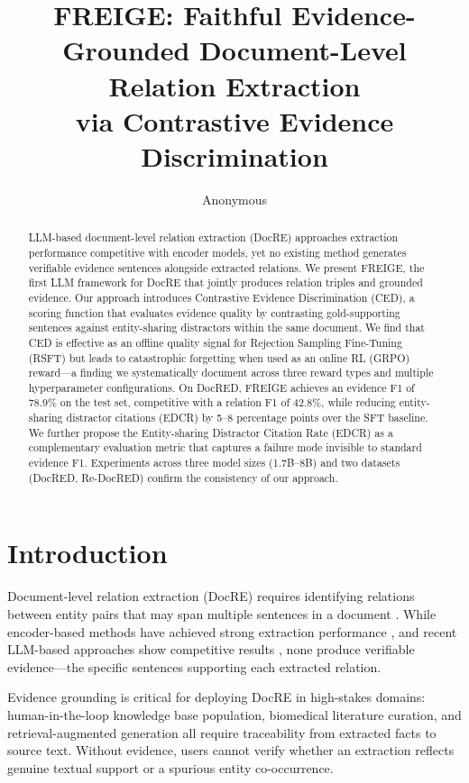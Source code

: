 \documentclass[11pt,a4paper]{article}
\title{FREIGE: Faithful Evidence-Grounded Document-Level Relation Extraction\\via Contrastive Evidence Discrimination}
\author{Anonymous}
\newcommand{\method}{FREIGE}
\newcommand{\ced}{CED}
\newcommand{\edcr}{EDCR}
\begin{document}
\maketitle

\begin{abstract}
LLM-based document-level relation extraction (DocRE) approaches extraction performance competitive with encoder models, yet no existing method generates verifiable evidence sentences alongside extracted relations. We present \method{}, the first LLM framework for DocRE that jointly produces relation triples and grounded evidence. Our approach introduces Contrastive Evidence Discrimination (\ced{}), a scoring function that evaluates evidence quality by contrasting gold-supporting sentences against entity-sharing distractors within the same document. We find that \ced{} is effective as an offline quality signal for Rejection Sampling Fine-Tuning (RSFT) but leads to catastrophic forgetting when used as an online RL (GRPO) reward---a finding we systematically document across three reward types and multiple hyperparameter configurations. On DocRED, \method{} achieves an evidence F1 of 78.9\% on the test set, competitive with a relation F1 of 42.8\%, while reducing entity-sharing distractor citations (EDCR) by 5--8 percentage points over the SFT baseline. We further propose the Entity-sharing Distractor Citation Rate (\edcr{}) as a complementary evaluation metric that captures a failure mode invisible to standard evidence F1. Experiments across three model sizes (1.7B--8B) and two datasets (DocRED, Re-DocRED) confirm the consistency of our approach.
\end{abstract}

\section{Introduction}

Document-level relation extraction (DocRE) requires identifying relations between entity pairs that may span multiple sentences in a document \cite{yao2019docred}. While encoder-based methods have achieved strong extraction performance \cite{zhou2021atlop,tan2022dreeam}, and recent LLM-based approaches show competitive results \cite{xu2024lmrc}, none produce verifiable evidence---the specific sentences supporting each extracted relation.

Evidence grounding is critical for deploying DocRE in high-stakes domains: human-in-the-loop knowledge base population, biomedical literature curation, and retrieval-augmented generation all require traceability from extracted facts to source text. Without evidence, users cannot verify whether an extraction reflects genuine textual support or a spurious entity co-occurrence.
\end{document}
